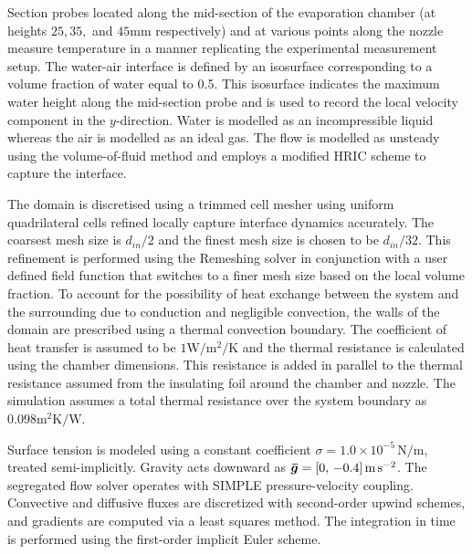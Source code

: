 Section probes located along the mid-section of the evaporation chamber (at heights $25, 35,$ and $45\si{\milli\meter}$ respectively) 
and at various 
points along the nozzle measure temperature in a manner replicating the experimental 
measurement setup. The water-air interface is defined by an isosurface corresponding to 
a volume fraction of water equal to 0.5. This isosurface indicates the maximum water 
height along the mid-section probe and is used to record the local 
velocity component in the \(y\)-direction.
Water is modelled as an incompressible liquid whereas the air is modelled as an ideal 
gas. The flow is modelled as unsteady using the volume-of-fluid method and employs a modified HRIC scheme to
capture the interface.

The domain is discretised using a trimmed cell mesher using uniform quadrilateral
 cells refined locally capture interface dynamics accurately.
 The coarsest mesh size is $d_{in}/2$ and the finest mesh size is chosen to be $d_{in}/32$. This refinement
 is performed using the Remeshing solver in conjunction with a user defined field function that
 switches to a finer mesh size based on the local volume fraction. To account for the possibility of
 heat exchange between the system and the surrounding due to conduction and negligible convection,
 the walls of the domain are prescribed using a thermal convection boundary. The coefficient
 of heat transfer is assumed to be $1\si{\watt\per\meter\squared\per\kelvin}$ and the thermal resistance
 is calculated using the chamber dimensions. This resistance is added in parallel to the thermal
 resistance assumed from the insulating foil around the chamber and nozzle. The simulation 
 assumes a total thermal resistance over the system boundary as $0.098\si{\meter\squared\kelvin\per\watt}$.

Surface tension is modeled using a constant coefficient  \(\sigma = 1.0 \times 10^{-5}\,\si{\newton\per\meter}\), treated 
semi-implicitly. Gravity acts downward as \(\bm{\bar{g}} = [0,\, -0.4]\,\si{\meter\per\second\squared}\).
The segregated flow solver operates with SIMPLE pressure-velocity coupling. 
Convective and diffusive fluxes are discretized with second-order upwind schemes, and gradients 
are computed via a least squares method. The integration in time is performed using the 
first-order implicit Euler scheme. 
